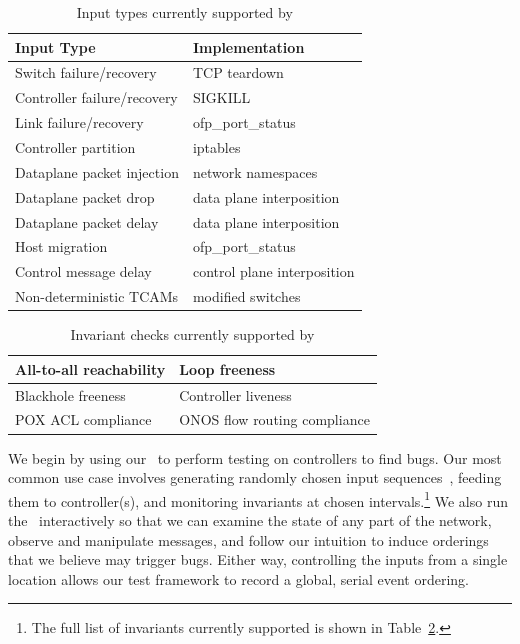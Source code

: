 \begin{table}
\centering
\begin{tabular}{|l|l|}
\hline
Input Type &  Implementation \\
\hline
\hline
Switch failure/recovery & TCP teardown \\
\hline
Controller failure/recovery & SIGKILL \\
\hline
Link failure/recovery & ofp\_port\_status \\
\hline
Controller partition & iptables \\
\hline
Dataplane packet injection & network namespaces \\
\hline
Dataplane packet drop & data plane interposition \\
\hline
Dataplane packet delay & data plane interposition \\
\hline
Host migration & ofp\_port\_status \\
\hline
Control message delay & control plane interposition \\
\hline
Non-deterministic TCAMs & modified switches \\
\hline
\end{tabular}
\caption{Input types currently supported by \projectname}
\label{tab:inputs}
\end{table}

\begin{table}
\centering
\begin{tabular}{|l|l|}
\hline
All-to-all reachability & Loop freeness \\
\hline
Blackhole freeness & Controller liveness \\
\hline
POX ACL compliance & ONOS flow routing compliance \\
\hline
\end{tabular}
\caption{Invariant checks currently supported by \projectname}
\label{tab:invariants}
\end{table}

We begin by using our \tester~to perform testing on controllers to find
bugs. Our most common use case involves generating randomly chosen input
sequences~\cite{Miller:1990:ESR:96267.96279}, feeding them to controller(s),
and monitoring
invariants at chosen intervals.\footnote{The full list of invariants currently
supported is shown in Table~\ref{tab:invariants}.}
We also run the \tester~interactively
so that we can examine the state of any part of the network,
observe and manipulate messages, and follow our
intuition to induce orderings that we believe may trigger bugs.
Either way, controlling the inputs from a single location
allows our test framework to record a global, serial
event ordering.

